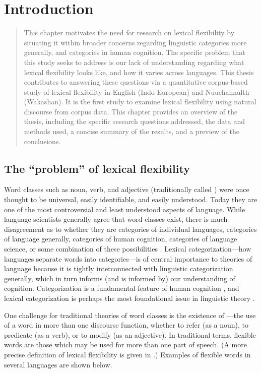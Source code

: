 \chapter{Introduction}
\label{ch:introduction}

\blockquote{This chapter motivates the need for research on lexical flexibility by situating it within broader concerns regarding linguistic categories more generally, and categories in human cognition. The specific problem that this study seeks to address is our lack of understanding regarding what lexical flexibility looks like, and how it varies across languages. This thesis contributes to answering these questions via a quantitative corpus-based study of lexical flexibility in English (Indo-European) and Nuuchahnulth (Wakashan). It is the first study to examine lexical flexibility using natural discourse from corpus data. This chapter provides an overview of the thesis, including the specific research questions addressed, the data and methods used, a concise summary of the results, and a preview of the conclusions.}

\section{The \enquote{problem} of lexical flexibility}

Word classes such as noun, verb, and adjective (traditionally called ) were once thought to be universal, easily identifiable, and easily understood. Today they are one of the most controversial and least understood aspects of language. While language scientists generally agree that word classes exist, there is much disagreement as to whether they are categories of individual languages, categories of language generally, categories of human cognition, categories of language science, or some combination of these possibilities . Lexical categorization—how languages separate words into categories—is of central importance to theories of language because it is tightly interconnected with linguistic categorization generally, which in turn informs (and is informed by) our understanding of cognition. Categorization is a fundamental feature of human cognition , and lexical categorization is perhaps the most foundational issue in linguistic theory .

One challenge for traditional theories of word classes is the existence of —the use of a word in more than one discourse function, whether to refer (as a noun), to predicate (as a verb), or to modify (as an adjective). In traditional terms, flexible words are those which may be used for more than one part of speech. (A more precise definition of lexical flexibility is given in .) Examples of flexible words in several languages are shown below.

